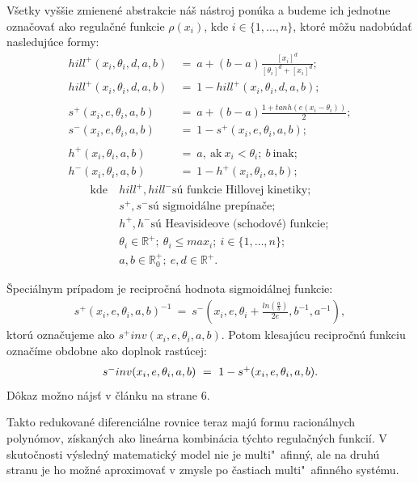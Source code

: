 \documentclass[11pt,final,oneside]{fithesis}
\begin{document}
V\v setky vy\v s\v sie zmienen\'e abstrakcie n\'a\v s n\'astroj pon\'uka a budeme ich jednotne ozna\v cova\v t ako regula\v cn\'e funkcie $\rho(x_i)$, kde 
$i \in \{1,\dots{},n\}$, ktor\'e m\^ o\v zu nadob\'uda\v t nasleduj\'uce formy:
\begin{align*}
hill^+(x_i, \theta_i, d, a, b) &\ = \ a + (b - a)\frac{[x_i]^d}{[\theta_i]^d + [x_i]^d};\\
hill^+(x_i, \theta_i, d, a, b) &\ = \ 1 - hill^+(x_i, \theta_i, d, a, b);\\
\\
s^+(x_i, e, \theta_i, a, b) &\ = \ a + (b - a)\frac{1 + tanh(e(x_i - \theta_i))}{2};\\
s^-(x_i, e, \theta_i, a, b) &\  = \ 1 - s^+(x_i, e, \theta_i, a, b);\\
\\
h^+(x_i,\theta_i,a,b) &\ = \ a,\ \textrm{ak}\ x_i < \theta_i;\ b\ \textrm{inak};\\
h^-(x_i,\theta_i,a,b) &\ = \ 1 - h^+(x_i,\theta_i,a,b);
\end{align*}
\begin{align*}
\textrm{kde}\ &hill^+, hill^- \textrm{s\'u funkcie Hillovej kinetiky};\\
&s^+, s^- \textrm{s\'u sigmoid\'alne prep\'ina\v ce};\\
&h^+, h^- \textrm{s\'u Heavisideove (schodov\'e) funkcie};\\
&\theta_i \in \mathbb{R}^+; \ \theta_i \leq max_i; \ i \in \{1,\dots{},n\};\\
&a, b \in \mathbb{R}_0^+; \ e, d \in \mathbb{R}^+.
\end{align*}

\noindent\v Speci\'alnym pr\'ipadom je recipro\v cn\'a hodnota sigmoid\'alnej funkcie:
\begin{align*}
s^+(x_i, e, \theta_i, a, b)^{-1} \ = \ s^-(x_i, e, \theta_i + \frac{ln(\frac{a}{b})}{2e}, b^{-1}, a^{-1}),
\end{align*}
ktor\'u ozna\v cujeme ako $s^+inv(x_i, e, \theta_i, a, b)$. Potom klesaj\'ucu recipro\v cn\'u funkciu ozna\v c\'ime obdobne ako doplnok rast\'ucej:
\begin{align*}
\centerline{$s^-inv(x_i, e, \theta_i, a, b) \ = \ 1 - s^+(x_i, e, \theta_i, a, b)$.}
\end{align*}
D\^ okaz mo\v zno n\'ajs\v t v \v cl\'anku \cite{CAV-2011} na strane 6.

Takto redukovan\' e diferenci\'alne rovnice teraz maj\'u formu racion\'alnych polyn\'omov, z\'iskan\'ych ako line\'arna kombin\'acia t\'ychto regula\v cn\'ych 
funkci\'i. V skuto\v cnosti v\'ysledn\'y 
matematick\'y model nie je multi"~afinn\'y, ale na druh\'u stranu je ho mo\v zn\'e aproximova\v t v zmysle po \v castiach mul\-ti"~afin\-n\'eho syst\'emu. 
\end{document}
